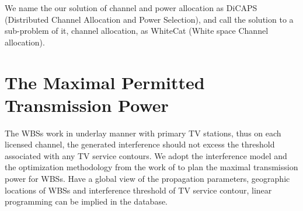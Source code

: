 We name the our solution of channel and power allocation as \gls{DiCAPS} (Distributed Channel Allocation and Power Selection), and call the solution to a sub-problem of it, \ie channel allocation, as \gls{WhiteCat} (White space Channel allocation).



%
%




\section{The Maximal Permitted Transmission Power}
\label{powermap}
The WBSs work in underlay manner with primary TV stations, thus on each licensed channel, the generated interference should not excess the threshold associated with any TV service contours.
We adopt the interference model and the optimization methodology from the work of \cite{multipleIntf_pimrc11} to plan the maximal transmission power for WBSs.
Have a global view of the propagation parameters, geographic locations of WBSs and interference threshold of TV service contour, linear programming can be implied in the database.

